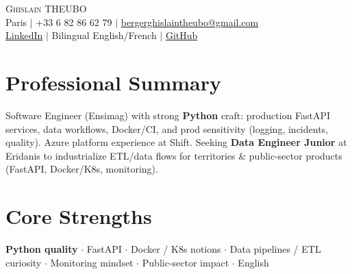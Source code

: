 \documentclass[letterpaper,10.5pt]{article}
\begin{document}
\begin{center}
{\Huge \scshape Ghislain THEUBO} \\ \vspace{2pt}
\small Paris $|$ +33 6 82 86 62 79 $|$ \href{mailto:bergerghislaintheubo@gmail.com}{bergerghislaintheubo@gmail.com} \\
\href{https://www.linkedin.com/in/berger-ghislain}{LinkedIn} $|$ Bilingual English/French $|$ \href{https://github.com/Bergerghislain}{GitHub}
\end{center}
\vspace{-6pt}
\section{Professional Summary}
\small{Software Engineer (Ensimag) with strong \textbf{Python} craft: production FastAPI services, data workflows, Docker/CI, and prod sensitivity (logging, incidents, quality). Azure platform experience at Shift. Seeking \textbf{Data Engineer Junior} at Eridanis to industrialize ETL/data flows for territories \& public-sector products (FastAPI, Docker/K8s, monitoring).}
\section{Core Strengths}
\small{\textbf{Python quality} $\cdot$ FastAPI $\cdot$ Docker / K8s notions $\cdot$ Data pipelines / ETL curiosity $\cdot$ Monitoring mindset $\cdot$ Public-sector impact $\cdot$ English}
\end{document}
